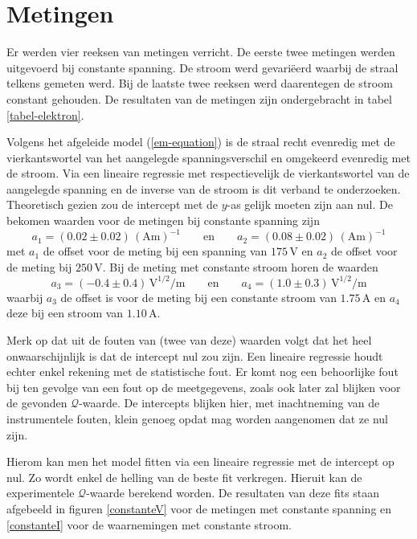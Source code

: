 \section{Metingen}

Er werden vier reeksen van metingen verricht. De eerste twee metingen 
werden uitgevoerd bij constante spanning. De stroom werd gevari\"eerd 
waarbij de straal telkens gemeten werd. Bij de laatste twee reeksen werd 
daarentegen de stroom constant gehouden. De resultaten van de metingen zijn 
ondergebracht in tabel \ref{tabel-elektron}.

Volgens het afgeleide model (\ref{em-equation}) is de straal recht 
evenredig met de vierkantswortel van het aangelegde spanningsverschil en 
omgekeerd evenredig met de stroom. Via een lineaire regressie met 
respectievelijk de vierkantswortel van de aangelegde spanning en de inverse 
van de stroom is dit verband te onderzoeken. Theoretisch gezien zou de 
intercept met de $y$-as gelijk moeten zijn aan nul.  De bekomen waarden 
voor de metingen bij constante spanning zijn
$$
a_1 = (0.02 \pm 0.02)\,(\textrm{Am})^{-1}
\qquad \textrm{en} \qquad
a_2 = (0.08 \pm 0.02)\,(\textrm{Am})^{-1}
$$
met $a_1$ de offset voor de meting bij een spanning van $175$\,V en $a_2$ de 
offset voor de meting bij $250$\,V. Bij de meting met constante stroom horen de 
waarden
$$
a_3 = (-0.4 \pm 0.4)\,\textrm{V}^{1/2}\textrm{/m}
\qquad \textrm{en} \qquad
a_4 = (1.0 \pm 0.3)\,\textrm{V}^{1/2}\textrm{/m}
$$
waarbij $a_3$ de offset is voor de meting bij een constante stroom van 
$1.75$\,A en $a_4$ deze bij een stroom van $1.10$\,A.

Merk op dat uit de fouten van (twee van deze) waarden volgt dat het heel 
onwaarschijnlijk is dat de intercept nul zou zijn. Een lineaire regressie 
houdt echter enkel rekening met de statistische fout. Er komt nog een 
behoorlijke fout bij ten gevolge van een fout op de meetgegevens, zoals ook 
later zal blijken voor de gevonden $\mathcal{Q}$-waarde. De intercepts blijken 
hier, met inachtneming van de instrumentele fouten, klein genoeg opdat mag 
worden aangenomen dat ze nul zijn.

Hierom kan men het model fitten via een lineaire regressie met de intercept op 
nul. Zo wordt enkel de helling van de beste fit verkregen. Hieruit kan de 
experimentele $\mathcal{Q}$-waarde berekend worden. De resultaten van deze fits 
staan afgebeeld in figuren \ref{constanteV} voor de metingen met constante 
spanning en \ref{constanteI} voor de waarnemingen met constante stroom.

